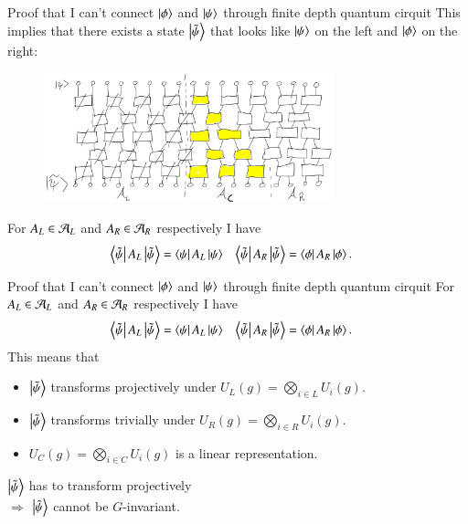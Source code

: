 \documentclass{beamer}
\begin{document}
\begin{frame}{Proof that I can't connect $\ket{\phi}$ and $\ket{\psi}$ through finite depth quantum cirquit}
	This implies that there exists a state $\ket{\tilde\psi}$ that looks like $\ket{\psi}$ on the left and $\ket{\phi}$ on the right:
	\begin{figure}
		\center
		\includegraphics[width=0.75\textwidth]{Figures/ConnectingPsiAndPsi0Proof2_WithLightcone.png}
	\end{figure}
	\pause
	For $A_L\in\AA_L$ and $A_R\in\AA_R$ respectively I have
	\begin{align}
		\bra{\tilde\psi}A_L\ket{\tilde{\psi}}&=\bra{\psi}A_L\ket{\psi}&\bra{\tilde\psi}A_R\ket{\tilde{\psi}}&=\bra{\phi}A_R\ket{\phi}.
	\end{align}
\end{frame}

\begin{frame}{Proof that I can't connect $\ket{\phi}$ and $\ket{\psi}$ through finite depth quantum cirquit}
	For $A_L\in\AA_L$ and $A_R\in\AA_R$ respectively I have
	\begin{align}
		\bra{\tilde\psi}A_L\ket{\tilde{\psi}}&=\bra{\psi}A_L\ket{\psi}&\bra{\tilde\psi}A_R\ket{\tilde{\psi}}&=\bra{\phi}A_R\ket{\phi}.
	\end{align}
	\pause
	This means that
	\begin{itemize}
		\item $\ket{\tilde{\psi}}$ transforms projectively under $U_L(g)=\bigotimes_{i \in L}U_i(g)$.
		\item $\ket{\tilde{\psi}}$ transforms trivially under $U_R(g)=\bigotimes_{i \in R}U_i(g)$.
		\item <3->$U_C(g)=\bigotimes_{i\in C}U_i(g)$ is a linear representation.
	\end{itemize}
	\pause
	\pause
	$\ket{\tilde{\psi}}$ has to transform projectively\\
	\pause
	$\Rightarrow$ $\ket{\tilde{\psi}}$ cannot be $G$-invariant.
\end{frame}
\end{document}
